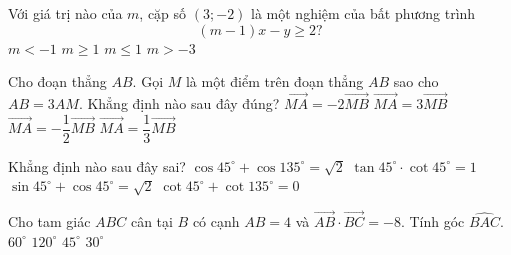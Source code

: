\begin{ex}%
	Với giá trị nào của $m$, cặp số $(3;-2)$ là một nghiệm của bất phương trình $$(m -1)x - y \geq 2?$$
	\choice
	{$m<-1$}
	{\True $m\geq 1$}
	{$m\leq 1$}
	{$m>-3 $}
\end{ex}
\begin{ex}%
	Cho đoạn thẳng $AB$. Gọi $M$ là một điểm trên đoạn thẳng $AB$ sao cho $AB = 3AM$. Khẳng định nào sau đây đúng?
	\choice
	{$\overrightarrow{MA}=-2\overrightarrow{MB}$}
	{$\overrightarrow{MA}=3\overrightarrow{MB}$}
	{\True $\overrightarrow{MA}=-\dfrac{1}{2}\overrightarrow{MB}$}
	{$\overrightarrow{MA}=\dfrac{1}{3}\overrightarrow{MB}$}
\end{ex}
\begin{ex}%
	Khẳng định nào sau đây sai?
	\choice
	{\True $\cos 45^\circ+\cos 135^\circ=\sqrt{2}$}
	{$\tan 45^\circ\cdot\cot 45^\circ=1$}
	{$\sin 45^\circ+\cos 45^\circ=\sqrt{2}$}
	{$\cot 45^\circ+\cot 135^\circ=0$}
\end{ex}
\begin{ex}%
	Cho tam giác $ABC$ cân tại $B$ có cạnh $AB=4$ và $\overrightarrow{AB}\cdot \overrightarrow{BC}=-8$. Tính góc $\widehat{BAC}$.
	\choice
	{\True $60^\circ $}
	{$120^\circ $}
	{$45^\circ $}
	{$30^\circ $}
\end{ex}
